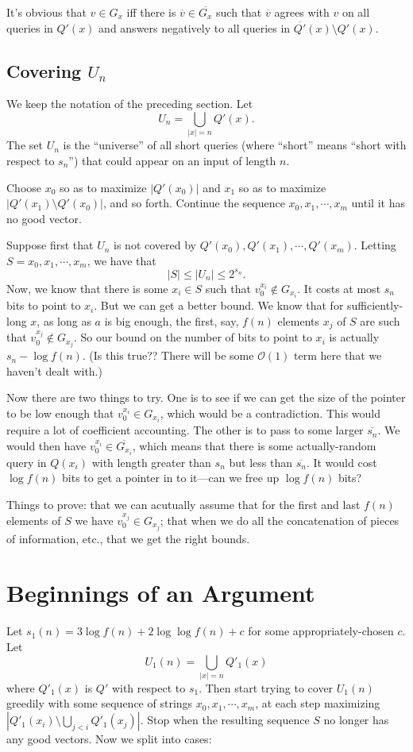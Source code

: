 \documentclass{article}
\begin{document}
It's obvious that $v \in G_x$ iff there is $\overline v \in \overline{G_x}$ such that $\overline v$ agrees with $v$ on all queries in $Q'(x)$ and answers negatively to all queries in $\overline{Q'}(x) \setminus Q'(x)$. 

\subsection{Covering $U_n$}

We keep the notation of the preceding section. Let
\[
U_n = \bigcup_{|x| = n} Q'(x).
\]
The set $U_n$ is the ``universe'' of all short queries (where ``short'' means ``short with respect to $s_n$'') that could appear on an input of length $n$. 

Choose $x_0$ so as to maximize $|Q'(x_0)|$ and $x_1$ so as to maximize $|Q'(x_1) \setminus Q'(x_0)|$, and so forth. Continue the sequence $x_0, x_1, \cdots , x_m$ until it has no good vector. 

Suppose first that $U_n$ is not covered by $Q'(x_0), Q'(x_1), \cdots , Q'(x_m)$. Letting $S = x_0, x_1, \cdots, x_m$, we have that 
\[
|S| \leq |U_n| \leq 2^{s_n}.
\]
Now, we know that there is some $x_i \in S$ such that $v_0^{x_i} \notin G_{x_i}$. It costs at most $s_n$ bits to point to $x_i$. But we can get a better bound. We know that for sufficiently-long $x$, as long as $a$ is big enough, the first, say, $f(n)$ elements $x_j$ of $S$ are such that $v_0^{x_j} \notin G_{x_j}$. So our bound on the number of bits to point to $x_i$ is actually $s_n - \log f(n)$. (Is this true?? There will be some $\mathcal O(1)$ term here that we haven't dealt with.) 

Now there are two things to try. One is to see if we can get the size of the pointer to be low enough that $v_0^{x_i} \in G_{x_i}$, which would be a contradiction. This would require a lot of coefficient accounting. The other is to pass to some larger $\overline{s_n}$. We would then have $v_0^{x_i} \in \overline{G_{x_i}}$, which means that there is some actually-random query in $Q(x_i)$ with length greater than $s_n$ but less than $\overline{s_n}$. It would cost $\log f(n)$ bits to get a pointer in to it---can we free up $\log f(n)$ bits? 

Things to prove: that we can acutually assume that for the first and last $f(n)$ elements of $S$ we have $v_{0}^{x_j} \in G_{x_j}$; that when we do all the concatenation of pieces of information, etc., that we get the right bounds. 

\section{Beginnings of an Argument}
Let $s_1(n) = 3 \log f(n) + 2 \log \log f(n) + c$ for some appropriately-chosen $c$. Let 
\[
U_1(n) = \bigcup_{|x| = n} Q'_1(x)
\]
where $Q'_1(x)$ is $Q'$ with respect to $s_1$. Then start trying to cover $U_1(n)$ greedily with some sequence of strings $x_0,x_1,\cdots,x_m$, at each step maximizing $|Q'_1(x_i) \setminus \bigcup_{j < i} Q'_1(x_j)|$. Stop when the resulting sequence $S$ no longer has any good vectors. Now we split into cases:
\end{document}
